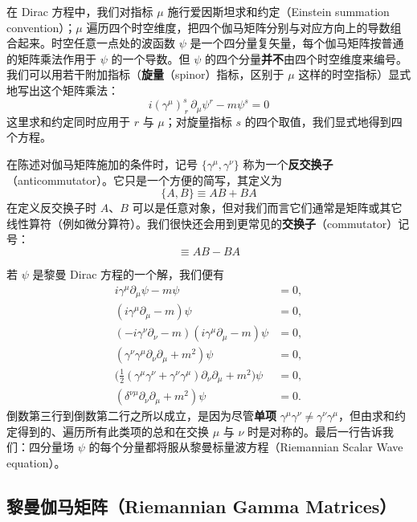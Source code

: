 在 Dirac 方程中，我们对指标 $\mu$ 施行爱因斯坦求和约定（Einstein summation convention）；$\mu$ 遍历四个时空维度，把四个伽马矩阵分别与对应方向上的导数组合起来。时空任意一点处的波函数 $\psi$ 是一个四分量复矢量，每个伽马矩阵按普通的矩阵乘法作用于 $\psi$ 的一个导数。但 $\psi$ 的四个分量\textbf{并不}由四个时空维度来编号。我们可以用若干附加指标（\textbf{旋量}（spinor）指标，区别于 $\mu$ 这样的时空指标）显式地写出这个矩阵乘法：
\begin{equation}
i(\gamma^{\mu})^{s}_{\,r}\,\partial_{\mu}\psi^{r}-m\psi^{s}=0
\end{equation}
这里求和约定同时应用于 $r$ 与 $\mu$；对旋量指标 $s$ 的四个取值，我们显式地得到四个方程。

在陈述对伽马矩阵施加的条件时，记号 $\{\gamma^{\mu},\gamma^{\nu}\}$ 称为一个\textbf{反交换子}（anticommutator）。它只是一个方便的简写，其定义为
\begin{equation}
\{A,B\}\equiv AB+BA
\end{equation}
在定义反交换子时 $A$、$B$ 可以是任意对象，但对我们而言它们通常是矩阵或其它线性算符（例如微分算符）。我们很快还会用到更常见的\textbf{交换子}（commutator）记号：
\begin{equation}
[A,B]\equiv AB-BA
\end{equation}

若 $\psi$ 是黎曼 Dirac 方程的一个解，我们便有
\begin{align*}
i\gamma^{\mu}\partial_{\mu}\psi - m\psi &= 0,\\
(i\gamma^{\mu}\partial_{\mu}-m)\psi &= 0,\\
(-i\gamma^{\nu}\partial_{\nu}-m)(i\gamma^{\mu}\partial_{\mu}-m)\psi &= 0,\\
(\gamma^{\nu}\gamma^{\mu}\partial_{\nu}\partial_{\mu}+m^{2})\psi &= 0,\\
\bigl(\tfrac12(\gamma^{\mu}\gamma^{\nu}+\gamma^{\nu}\gamma^{\mu})\partial_{\nu}\partial_{\mu}+m^{2}\bigr)\psi &= 0,\\
(\delta^{\nu\mu}\partial_{\nu}\partial_{\mu}+m^{2})\psi &= 0 .
\end{align*}
倒数第三行到倒数第二行之所以成立，是因为尽管\textbf{单项} $\gamma^{\mu}\gamma^{\nu}\neq\gamma^{\nu}\gamma^{\mu}$，但由求和约定得到的、遍历所有此类项的总和在交换 $\mu$ 与 $\nu$ 时是对称的。最后一行告诉我们：四分量场 $\psi$ 的每个分量都将服从黎曼标量波方程（Riemannian Scalar Wave equation）。

\subsection{黎曼伽马矩阵（Riemannian Gamma Matrices）}

